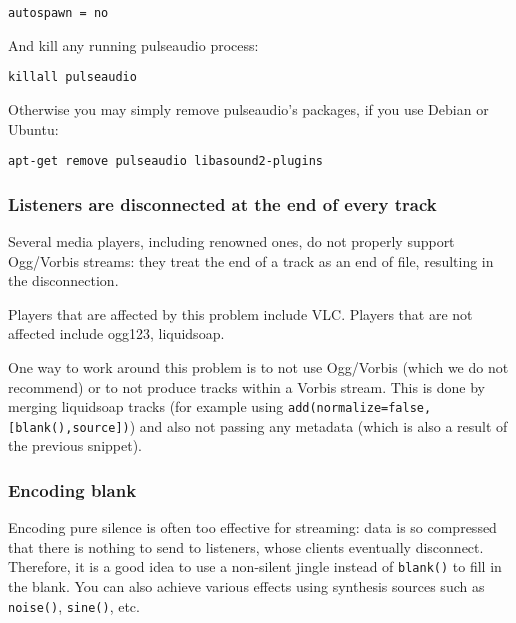 \begin{verbatim}
autospawn = no
\end{verbatim}
And kill any running pulseaudio process:

\begin{verbatim}
killall pulseaudio
\end{verbatim}
Otherwise you may simply remove pulseaudio's packages, if you use Debian or
Ubuntu:

\begin{verbatim}
apt-get remove pulseaudio libasound2-plugins
\end{verbatim}

\subsubsection{Listeners are disconnected at the end of every track}
Several media players, including renowned ones, do not properly support
Ogg/Vorbis streams: they treat the end of a track as an end of file, resulting
in the disconnection.

Players that are affected by this problem include VLC.  Players that are not
affected include ogg123, liquidsoap.

One way to work around this problem is to not use Ogg/Vorbis (which we do not
recommend) or to not produce tracks within a Vorbis stream.  This is done by
merging liquidsoap tracks (for example using
\verb+add(normalize=false,[blank(),source])+) and also not passing any metadata
(which is also a result of the previous snippet).

\subsubsection{Encoding blank}
Encoding pure silence is often too effective for streaming: data is so
compressed that there is nothing to send to listeners, whose clients eventually
disconnect. Therefore, it is a good idea to use a non-silent jingle instead of
\verb+blank()+ to fill in the blank. You can also achieve various effects using
synthesis sources such as \verb+noise()+, \verb+sine()+, etc.
